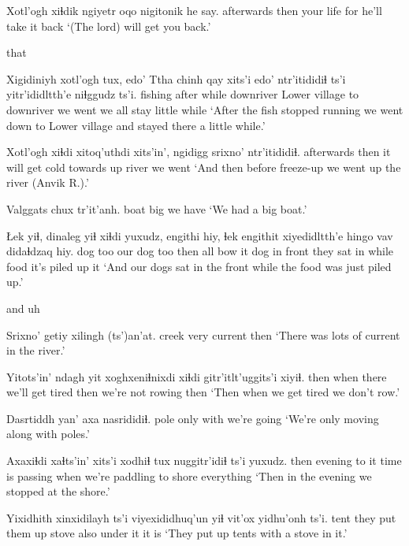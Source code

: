 \documentclass[12pt]{article}
\begin{document}
\gll Xotl'ogh   xiɬdik ngiyetr   oqo nigitonik {he say}.
afterwards then   {your life} for {he'll take it back}
\glt `(The lord) will get you back.'
\glend

that 

\gll Xigidiniyh xotl'ogh tux,   edo'      {Ttha chinh qay} xits'i edo' ntr'itididiɬ ts'i yitr'ididltth'e {niɬggudz ts'i.}
fishing    after    while downriver {Lower village} to  downriver  {we went}  {}   {we all stay}    {little while} 
\glt `After the fish stopped running we went down to Lower village and stayed there a little while.'
\glend

\gll Xotl'ogh  xiɬdi xitoq'uthdi               xits'in', ngidigg srixno' ntr'itididiɬ.
afterwards then {it will get cold} towards up river        {we went}
\glt `And then before freeze-up we went up the river (Anvik R.).'
\glend

\gll Valggats chux tr'it'anh. 
boat     big  {we have   }
\glt `We had a big boat.'
\glend

\gll Łek yiɬ, dinaleg yiɬ xiɬdi yuxudz, engithi hiy, ɬek engithit  xiyedidltth'e hingo vav  didaɬdzaq   hiy. 
dog too {our dog} too then  all    bow    it  dog {in front} {they sat in} while food {it's piled up} it
\glt `And our dogs sat in the front while the food was just piled up.'
\glend

and uh

\gll Srixno' getiy xilingh          (ts')an'at.
creek   very  current then
\glt `There was lots of current in the river.'
\glend

\gll Yitots'in' ndagh yit   xoghxeniɬnixdi xiɬdi gitr'itlt'uggits'i xiyiɬ.
then       when  there {we'll get tired}   then  {we're not rowing } then
\glt `Then when we get tired we don't row.'
\glend

\gll Dasrtiddh yan' axa  nasrididiɬ.
 pole      only with {we're going}
\glt `We're only moving along with poles.'
\glend

\gll Axaxiɬdi xaɬts'in' xits'i xodhiɬ       tux  nuggitr'idiɬ                ts'i yuxudz.
then     evening   {to it} {time is passing} when {we're paddling to shore} {}  everything
\glt `Then in the evening we stopped at the shore.'
\glend

\gll Yixidhith xinxidilayh      ts'i viyexididhuq'un yiɬ vit'ox   yidhu'onh ts'i.
tent      {they put them up} {}     stove           also  {under it} {it is}
\glt `They put up tents with a stove in it.'
\glend
\end{document}

